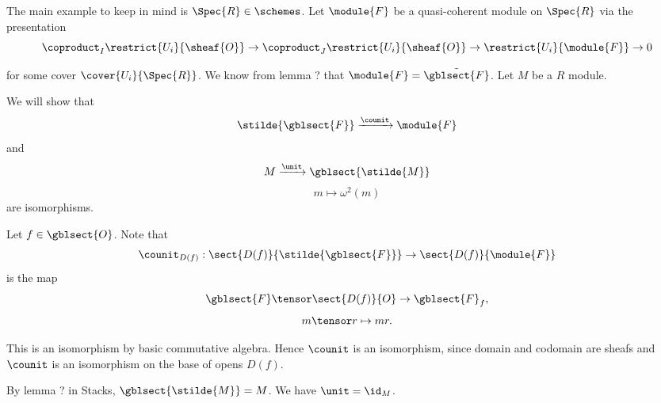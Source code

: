 \begin{example}
The main example to keep in mind is $\Spec{R} \in \schemes$.
Let $\module{F}$ be a quasi-coherent module on $\Spec{R}$
via the presentation
\[\coproduct_{I} \restrict{U_i}{\sheaf{O}} \rightarrow \coproduct_J \restrict{U_i}{\sheaf{O}} 
	\rightarrow \restrict{U_i}{\module{F}} \rightarrow 0\]

for some cover $\cover{U_i}{\Spec{R}}$.
We know from lemma ? that $\module{F} = \tilde{\gblsect{F}}$.
Let $M$ be a $R$ module.

We will show that
\[\stilde{\gblsect{F}} \xrightarrow{\counit} \module{F}\]
and
\[M \xrightarrow{\unit} \gblsect{\stilde{M}}\]
\[m \mapsto \omega^2(m)\]
are isomorphisms.

Let $f \in \gblsect{O}$.
Note that 
\[\counit_{D(f)}: \sect{D(f)}{\stilde{\gblsect{F}}} \rightarrow \sect{D(f)}{\module{F}}\]
is the map
\[\gblsect{F}\tensor \sect{D(f)}{O} \rightarrow \gblsect{F}_f,\]
\[m \tensor r \mapsto mr.\]

This is an isomorphism by basic commutative algebra. Hence $\counit$ is an isomorphism, since domain and codomain are sheafs and $\counit$ is an isomorphism on the base of opens $D(f)$.

By lemma ? in Stacks, $\gblsect{\stilde{M}} = M$.
We have $\unit = \id_M$.
\end{example}